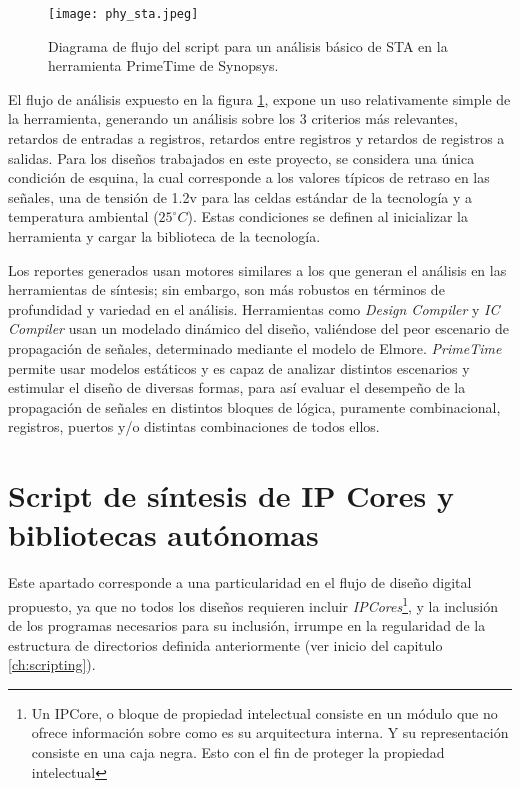 \begin{figure}[ht]
\texttt{[image: phy\_sta.jpeg]}
\centering
\caption{Diagrama de flujo del script para un análisis básico de STA en la herramienta PrimeTime de Synopsys.}
\label{fig:stascript}
\end{figure}

El flujo de análisis expuesto en la figura \ref{fig:stascript}, expone un uso relativamente simple de la herramienta, generando un análisis sobre los 3 criterios más relevantes, retardos de entradas a registros, retardos entre registros y retardos de registros a salidas. Para los diseños trabajados en este proyecto, se considera una única condición de esquina, la cual corresponde a los valores típicos de retraso en las señales, una de tensión de 1.2v para las celdas estándar de la tecnología y a temperatura ambiental ($25^{\circ}C$). Estas condiciones se definen al inicializar la herramienta y cargar la biblioteca de la tecnología.

Los reportes generados usan motores similares a los que generan el análisis en las herramientas de síntesis; sin embargo, son más robustos en términos de profundidad y variedad en el análisis. Herramientas como \textit{Design Compiler} y \textit{IC Compiler} usan un modelado dinámico del diseño, valiéndose del peor escenario de propagación de señales, determinado mediante el modelo de Elmore. \textit{PrimeTime} permite usar modelos estáticos y es capaz de analizar distintos escenarios y estimular el diseño de diversas formas, para así evaluar el desempeño de la propagación de señales en distintos bloques de lógica, puramente combinacional, registros, puertos y/o distintas combinaciones de todos ellos.

\section{Script de síntesis de IP Cores y bibliotecas autónomas}

Este apartado corresponde a una particularidad en el flujo de diseño digital propuesto, ya que no todos los diseños requieren incluir \textit{IPCores}\footnote{Un IPCore, o bloque de propiedad intelectual consiste en un módulo que no ofrece información sobre como es su arquitectura interna. Y su representación consiste en una caja negra. Esto con el fin de proteger la propiedad intelectual}, y la inclusión de los programas necesarios para su inclusión, irrumpe en la regularidad de la estructura de directorios definida anteriormente (ver inicio del capitulo \ref{ch:scripting}).

